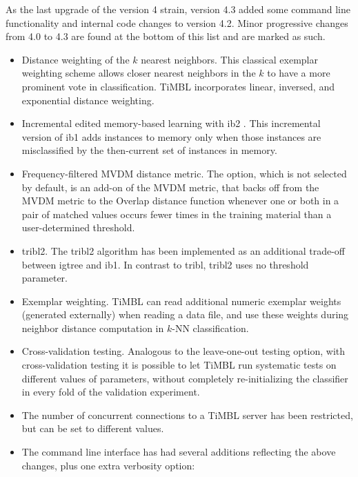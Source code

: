 \documentclass{report}
\begin{document}
As the last upgrade of the version 4 strain, version 4.3 added some
command line functionality and internal code changes to version
4.2. Minor progressive changes from 4.0 to 4.3 are found at the bottom
of this list and are marked as such.

\begin{itemize}

\item Distance weighting of the $k$ nearest neighbors. This classical
exemplar weighting scheme \cite{Dudani76} allows closer nearest
neighbors in the $k$ to have a more prominent vote in
classification. TiMBL incorporates linear, inversed, and exponential
distance weighting.

\item Incremental edited memory-based learning with {\sc ib2}
\cite{Aha+91}. This incremental version of {\sc ib1} adds instances to
memory only when those instances are misclassified by the then-current
set of instances in memory.

\item Frequency-filtered MVDM distance metric. The option, which is
not selected by default, is an add-on of the MVDM metric, that backs
off from the MVDM metric to the Overlap distance function whenever one
or both in a pair of matched values occurs fewer times in the training
material than a user-determined threshold.

\item {\sc tribl2}. The {\sc tribl2} algorithm has been implemented
as an additional trade-off between {\sc igtree} and {\sc ib1}. In
contrast to {\sc tribl}, {\sc tribl2} uses no threshold parameter.

\item Exemplar weighting. TiMBL can read additional numeric exemplar
weights (generated externally) when reading a data file, and use these
weights during neighbor distance computation in $k$-NN classification.

\item Cross-validation testing. Analogous to the leave-one-out testing
option, with cross-validation testing it is possible to let TiMBL run
systematic tests on different values of parameters, without completely
re-initializing the classifier in every fold of the validation experiment.

\item The number of concurrent connections to a TiMBL server has been
restricted, but can be set to different values.

\item The command line interface has had several additions reflecting
the above changes, plus one extra verbosity option:


\end{itemize}
\end{document}
